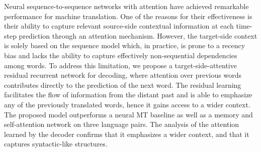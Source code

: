 Neural sequence-to-sequence networks with attention have achieved remarkable performance for machine translation. One of the reasons for their effectiveness is their ability to capture relevant source-side contextual information at each time-step prediction through an attention mechanism. However, the target-side context is solely based on the sequence model which, in practice, is prone to a recency bias and lacks the ability to capture effectively non-sequential dependencies among words. To address this limitation, we propose a target-side-attentive residual recurrent network for decoding, where attention over previous words contributes directly to the prediction of the next word. The residual learning facilitates  the flow of information from the distant past and is able to emphasize any of the previously translated words, hence it gains access to a wider context. The proposed model outperforms a neural MT baseline as well as a memory and self-attention network on three language pairs. The analysis of the attention learned by the decoder confirms that it emphasizes a wider context, and that it captures syntactic-like structures.
